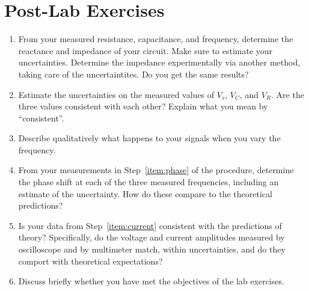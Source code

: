 \documentclass[12pt]{article}
\begin{document}
\newpage

\section*{Post-Lab Exercises}

\begin{enumerate}

\item From your measured resistance, capacitance, and frequency,
  determine the reactance and impedance of your circuit.  Make sure to
  estimate your uncertainties.  Determine the impedance experimentally
  via another method, taking care of the uncertaintites.%
  Do you get the same results?
\item Estimate the uncertainties on the measured values of $V_s$,
  $V_C$, and $V_R$.  Are the three values consistent with each other?
  Explain what you mean by ``consistent''.
\item Describe qualitatively what happens to your signals when you
  vary the frequency.
\item From your measurements in Step~\ref{item:phase} of the
  procedure, determine the phase shift at each of the three measured
  frequencies, including an estimate of the uncertainty.  How do these
  compare to the theoretical predictions? 
\item Is your data from Step~\ref{item:current} consistent with the
  predictions of theory?  Specifically, do the voltage and current
  amplitudes measured by oscilloscope and by multimeter match, within
  uncertainties, and do they comport with theoretical expectations?
\item Discuss briefly whether you have met the objectives of the lab
  exercises.
\end{enumerate}
\end{document}
